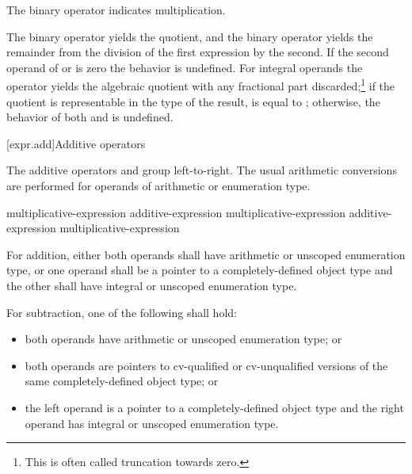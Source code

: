 \pnum
The binary \tcode{*} operator indicates multiplication.

\pnum
The binary \tcode{/} operator yields the quotient, and the binary
\tcode{\%} operator yields the remainder from the division of the first
expression by the second.
%
If the second operand of \tcode{/} or \tcode{\%} is zero the behavior is
undefined.
For integral operands the \tcode{/} operator yields the algebraic quotient with
any fractional part discarded;\footnote{This is often called truncation towards
zero.} if the quotient  is representable in the type of the result,
 is equal to ; otherwise, the behavior
of both  and  is undefined.

[expr.add]{Additive operators}%
%

\pnum
The additive operators \tcode{+} and \tcode{-} group left-to-right. The
usual arithmetic conversions are performed for operands of arithmetic or
enumeration type.

%
%
%
%
%
\begin{bnf}
\br
    multiplicative-expression\br
    additive-expression \terminal{+} multiplicative-expression\br
    additive-expression \terminal{-} multiplicative-expression
\end{bnf}

%
For addition, either both operands shall have arithmetic or unscoped enumeration
type, or one operand shall be a pointer to a completely-defined object
type and the other shall have integral or unscoped enumeration type.

\pnum
For subtraction, one of the following shall hold:

\begin{itemize}
\item both operands have arithmetic or unscoped enumeration type; or

%
\item both operands are pointers to cv-qualified or cv-unqualified
versions of the same completely-defined object type; or

\item the left operand is a pointer to a completely-defined object type
and the right operand has integral or unscoped enumeration type.
\end{itemize}

